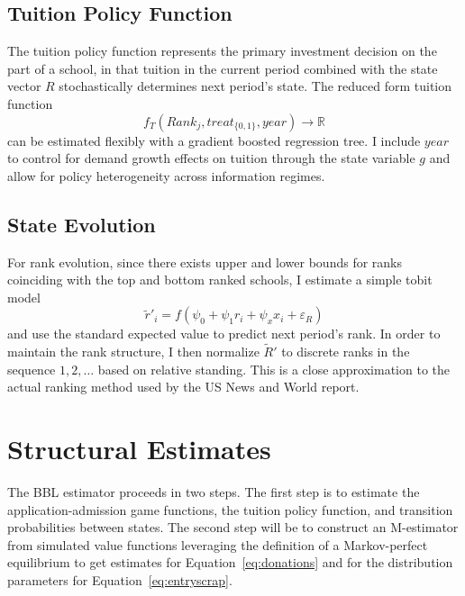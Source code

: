 \documentclass[12pt]{article}
\theoremstyle{definition}
\begin{document}
\subsection{Tuition Policy Function}
\label{sec:tuition_strategy}
The tuition policy function represents the primary investment decision on the part of a school, in that tuition in the current period combined with the state vector $R$ stochastically determines next period's state. The reduced form tuition function
\begin{equation}
  f_T(Rank_j, treat_{\{0, 1\}}, year) \rightarrow \mathbb{R}
  \label{eq:fs_tuition}
\end{equation}
can be estimated flexibly with a gradient boosted regression tree. I include $year$ to control for demand growth effects on tuition through the state variable $g$ and allow for policy heterogeneity across information regimes.

\subsection{State Evolution}
\label{sec:state_evolution_strategy}
For rank evolution, since there exists upper and lower bounds for ranks coinciding with the top and bottom ranked schools, I estimate a simple tobit model
\begin{equation}
  \tilde{r}'_{i} = f(\psi_0 + \psi_1 r_i + \psi_x x_i + \varepsilon_R)
  \label{eq:fs_rank_evolution}
\end{equation}
and use the standard expected value to predict next period's rank. In order to maintain the rank structure, I then normalize $\tilde{R}'$ to discrete ranks in the sequence $1, 2, \dots$ based on relative standing. This is a close approximation to the actual ranking method used by the US News and World report.



\section{Structural Estimates}
\label{sec:structural_est}
The BBL estimator proceeds in two steps. The first step is to estimate the application-admission game functions, the tuition policy function, and transition probabilities between states. The second step will be to construct an M-estimator from simulated value functions leveraging the definition of a Markov-perfect equilibrium to get estimates for Equation~\eqref{eq:donations} and for the distribution parameters for Equation~\eqref{eq:entryscrap}.
\end{document}

